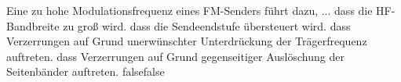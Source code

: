     {Eine zu hohe Modulationsfrequenz eines FM-Senders führt dazu, ...}
    {dass die HF-Bandbreite zu groß wird.}
    {dass die Sendeendstufe übersteuert wird.}
    {dass Verzerrungen auf Grund unerwünschter Unterdrückung der Trägerfrequenz auftreten.}
    {dass Verzerrungen auf Grund gegenseitiger Auslöschung der Seitenbänder auftreten.}
    {false}{false}